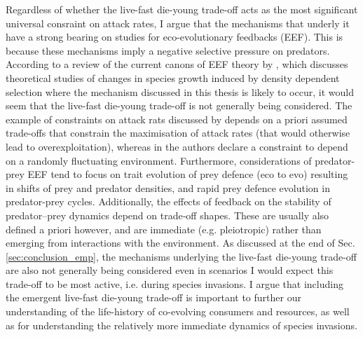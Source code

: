 \documentclass[a4paper]{report}
\begin{document}
  Regardless of whether the live-fast die-young trade-off acts as the most significant universal consraint on attack rates, I argue that the mechanisms that underly it have a strong bearing on studies for eco-evolutionary feedbacks (EEF).  This is because these mechanisms imply a negative selective pressure on predators. According to a review of the current canons of EEF theory by \citep{Govaert2018}, which discusses theoretical studies of changes in species growth induced by density dependent selection where the mechanism discussed in this thesis is likely to occur, it would seem that the live-fast die-young trade-off is not generally being considered. The example of constraints on attack rats discussed by \citep{The2013} depends on a priori assumed trade-offs that constrain the maximisation of attack rates (that would otherwise lead to overexploitation), whereas in \citep{Lande2007} the authors declare a constraint to depend on a randomly fluctuating environment. Furthermore, considerations of predator-prey EEF tend to focus on trait evolution of prey defence (eco to evo) resulting in shifts of prey and predator densities, and rapid prey defence evolution in predator-prey cycles. Additionally, the effects of feedback on the stability of predator–prey dynamics depend on trade‐off shapes. These are usually also defined a priori however, and are immediate (e.g. pleiotropic) rather than emerging from interactions with the environment. As discussed at the end of Sec. \ref{sec:conclusion_emp}, the mechanisms underlying the live-fast die-young trade-off are also not generally being considered even in scenarios I would expect this trade-off to be most active, i.e. during species invasions. I argue that including the emergent live-fast die-young trade-off is important to further our understanding of the life-history of co-evolving consumers and resources, as well as for understanding the relatively more immediate dynamics of species invasions.\\

 





\end{document}

